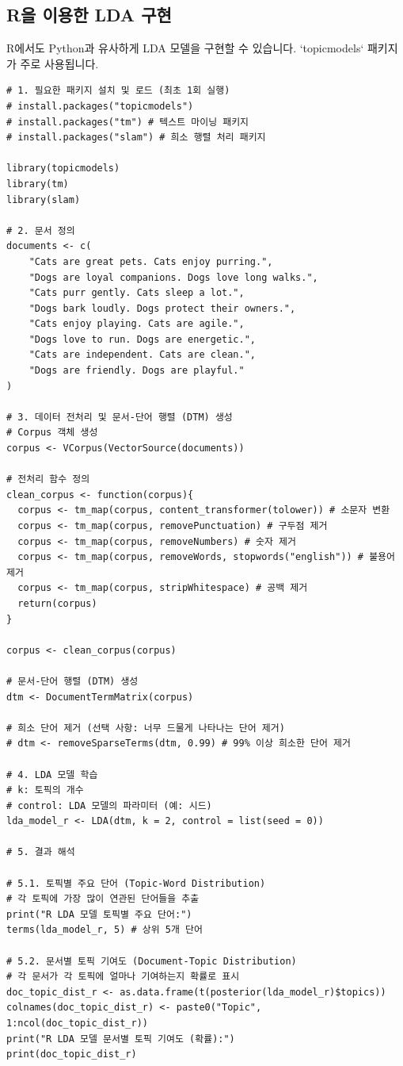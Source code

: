 \documentclass[11pt,a4paper]{article}
\begin{document}
\newpage
\subsection*{R을 이용한 LDA 구현}
R에서도 Python과 유사하게 LDA 모델을 구현할 수 있습니다. `topicmodels` 패키지가 주로 사용됩니다.

\begin{lstlisting}[caption={R을 이용한 LDA 구현 예시}, label={lst:r_lda}]
# 1. 필요한 패키지 설치 및 로드 (최초 1회 실행)
# install.packages("topicmodels")
# install.packages("tm") # 텍스트 마이닝 패키지
# install.packages("slam") # 희소 행렬 처리 패키지

library(topicmodels)
library(tm)
library(slam)

# 2. 문서 정의
documents <- c(
    "Cats are great pets. Cats enjoy purring.",
    "Dogs are loyal companions. Dogs love long walks.",
    "Cats purr gently. Cats sleep a lot.",
    "Dogs bark loudly. Dogs protect their owners.",
    "Cats enjoy playing. Cats are agile.",
    "Dogs love to run. Dogs are energetic.",
    "Cats are independent. Cats are clean.",
    "Dogs are friendly. Dogs are playful."
)

# 3. 데이터 전처리 및 문서-단어 행렬 (DTM) 생성
# Corpus 객체 생성
corpus <- VCorpus(VectorSource(documents))

# 전처리 함수 정의
clean_corpus <- function(corpus){
  corpus <- tm_map(corpus, content_transformer(tolower)) # 소문자 변환
  corpus <- tm_map(corpus, removePunctuation) # 구두점 제거
  corpus <- tm_map(corpus, removeNumbers) # 숫자 제거
  corpus <- tm_map(corpus, removeWords, stopwords("english")) # 불용어 제거
  corpus <- tm_map(corpus, stripWhitespace) # 공백 제거
  return(corpus)
}

corpus <- clean_corpus(corpus)

# 문서-단어 행렬 (DTM) 생성
dtm <- DocumentTermMatrix(corpus)

# 희소 단어 제거 (선택 사항: 너무 드물게 나타나는 단어 제거)
# dtm <- removeSparseTerms(dtm, 0.99) # 99% 이상 희소한 단어 제거

# 4. LDA 모델 학습
# k: 토픽의 개수
# control: LDA 모델의 파라미터 (예: 시드)
lda_model_r <- LDA(dtm, k = 2, control = list(seed = 0))

# 5. 결과 해석

# 5.1. 토픽별 주요 단어 (Topic-Word Distribution)
# 각 토픽에 가장 많이 연관된 단어들을 추출
print("R LDA 모델 토픽별 주요 단어:")
terms(lda_model_r, 5) # 상위 5개 단어

# 5.2. 문서별 토픽 기여도 (Document-Topic Distribution)
# 각 문서가 각 토픽에 얼마나 기여하는지 확률로 표시
doc_topic_dist_r <- as.data.frame(t(posterior(lda_model_r)$topics))
colnames(doc_topic_dist_r) <- paste0("Topic", 1:ncol(doc_topic_dist_r))
print("R LDA 모델 문서별 토픽 기여도 (확률):")
print(doc_topic_dist_r)


\end{lstlisting}
\end{document}
